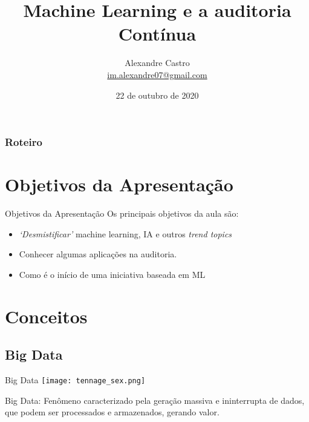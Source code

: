 \documentclass[aspectratio=169]{beamer}
\title[Machine learning e a auditoria]{Machine Learning e a auditoria Contínua}
\begin{document}
\author[M. Alexandre P. C. Junior]{
    \begin{tabular}{c} 
        \Large
        Alexandre Castro\\
        \footnotesize \href{mailto:im.alexandre07@gmail.com}{im.alexandre07@gmail.com}
    \end{tabular}}


\date{22 de outubro de 2020}


\begin{frame}\maketitle\end{frame}


\begin{frame}
    \frametitle{Roteiro}
    \tableofcontents[pausesections]
\end{frame}


\section{Objetivos da Apresentação}
\begin{frame}{Objetivos da Apresentação}
    Os principais objetivos da aula são:
    \begin{itemize}[<+- | uncover@+>]
        \item \textit{`Desmistificar'} machine learning, IA e outros \textit{trend topics}
        \item Conhecer algumas aplicações na auditoria.
        \item Como é o início de uma iniciativa baseada em ML
    \end{itemize}
\end{frame}


\section{Conceitos}
\subsection{Big Data}
\begin{frame}{Big Data}
    \centering
    \texttt{[image: tennage\_sex.png]} \\
    \begin{block}{}
        Big Data:  Fenômeno caracterizado pela geração massiva e 
        ininterrupta de dados, que podem ser processados e armazenados, gerando valor.
    \end{block}
\end{frame}
\end{document}
